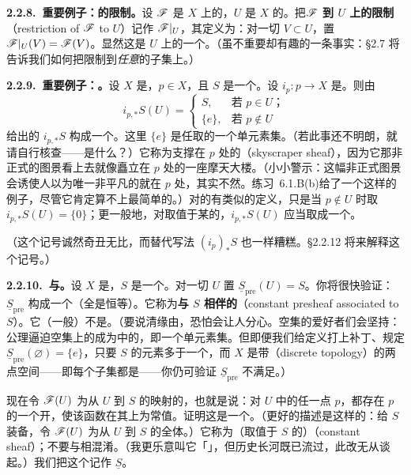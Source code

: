 \textbf{2.2.8.\ 重要例子：\trSheaf{}的限制。}\quad 设 $\mathscr{F}$ 是 $X$ 上的\trSheaf，$U$ 是 $X$ 的\trOpenSubset。把\textbf{$\mathscr{F}$ 到 $U$ 上的限制}（restriction of $\mathscr{F}$ to $U$）记作 $\mathscr{F}|_U$，其定义为：对一切\trOpenSubset{} $V\subset U$，置 $\mathscr{F}|_U(V)=\mathscr{F}(V)$。显然这是 $U$ 上的一个\trSheaf。（虽不重要却有趣的一条事实：\S2.7 将告诉我们如何把\trSheaf{}限制到\emph{任意}的子集上。）

\textbf{2.2.9.\ 重要例子：\trSkyscraperSheaf。}\quad 设 $X$ 是\trTopologicalSpace{}，$p\in X$，且 $S$ 是一个\trSet。设 $i_p\colon p\to X$ 是\trInclusionMap。则由
\[
i_{p,*}S(U)=
\begin{cases}
S, & \text{若 } p\in U\text{；}\\
\{e\}, & \text{若 } p\notin U
\end{cases}
\]
给出的 $i_{p,*}S$ 构成一个\trSheaf。这里 $\{e\}$ 是任取的一个单元素集。（若此事还不明朗，就请自行核查——\trRestrictionMap{}是什么？）它称为支撑在 $p$ 处的\textbf{\trSkyscraperSheaf}（skyscraper sheaf），因为它那非正式的图景看上去就像矗立在 $p$ 处的一座摩天大楼。（小小警示：这幅非正式图景会诱使人以为\trSkyscraperSheaf{}唯一非平凡的\trStalk{}就在 $p$ 处，其实不然。\mbox{练习~6.1.B(b)}给了一个这样的例子，尽管它肯定算不上最简单的。）对\trAbelianGroups{}的\trSheaf{}有类似的定义，只是当 $p\notin U$ 时取 $i_{p,*}S(U)=\{0\}$；更一般地，对取值于某\trCategory{}的\trSheaf，$i_{p,*}S(U)$ 应当取成一个\trFinalObject。

（这个记号诚然奇丑无比，而替代写法 $(i_p)_*S$ 也一样糟糕。\S2.2.12 将来解释这个记号。）

\textbf{2.2.10.\ \trConstantPresheaf{}与\trConstantSheaf。}\quad 设 $X$ 是\trTopologicalSpace{}，$S$ 是一个\trSet。对一切\trOpenSet{} $U$ 置 $\underline{S}_{\mathrm{pre}}(U)=S$。你将很快验证：$\underline{S}_{\mathrm{pre}}$ 构成一个\trPresheaf（\trRestrictionMap{}全是恒等）。它称为\textbf{与 $S$ 相伴的\trConstantPresheaf}（constant presheaf associated to $S$）。它（一般）不是\trSheaf。（要说清缘由，恐怕会让人分心。空集的爱好者们会坚持：\trSheaf{}公理逼迫空集上的\trSection{}成为\trCategory{}中的\trFinalObject{}，即一个单元素集。但即便我们给定义打上补丁、规定 $\underline{S}_{\mathrm{pre}}(\varnothing)=\{e\}$，只要 $S$ 的元素多于一个，而 $X$ 是带\textbf{\trDiscreteTopology}（discrete topology）的两点空间——即每个子集都是\trOpenSet——你仍可验证 $\underline{S}_{\mathrm{pre}}$ 不满足\trGluability。）

\begin{exercise}[\trConstantSheaf]\label{ex:constant-sheaves}
现在令 $\mathscr{F}(U)$ 为从 $U$ 到 $S$ 的\emph{\trLocallyConstant}映射的\trSet，也就是说：对 $U$ 中的任一点 $p$，都存在 $p$ 的一个开\trNeighborhood，使该函数在其上为常值。证明这是一个\emph{\trSheaf}。（更好的描述是这样的：给 $S$ 装备\trDiscreteTopology，令 $\mathscr{F}(U)$ 为从 $U$ 到 $S$ 的\trContinuousMap{}全体。）它称为（取值于 $S$ 的）\textbf{\trConstantSheaf}（constant sheaf）；不要与\trConstantPresheaf{}相混淆。（我更乐意叫它「\emph{\trLocallyConstant\trSheaf}」，但历史长河既已流过，此改无从谈起。）我们把这个\trSheaf{}记作 $\underline{S}$。
\end{exercise}

